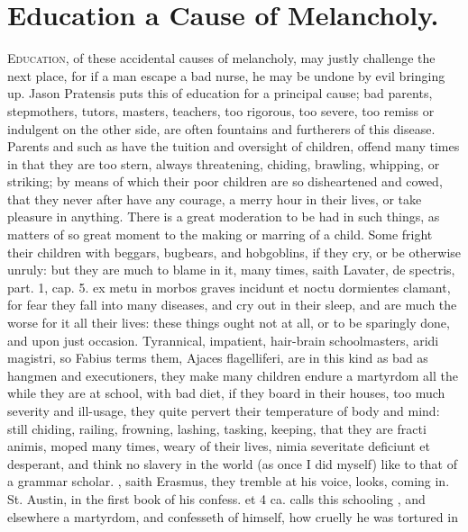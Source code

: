 {%
\section{Education a Cause of Melancholy.}

\lettrine{E}{ducation}, of these accidental causes of melancholy, may justly
challenge the next place, for if a man escape a bad nurse, he may be
undone by evil bringing up. Jason Pratensis puts this of
education for a principal cause; bad parents, stepmothers, tutors,
masters, teachers, too rigorous, too severe, too remiss or indulgent on
the other side, are often fountains and furtherers of this disease.
Parents and such as have the tuition and oversight of children, offend
many times in that they are too stern, always threatening, chiding,
brawling, whipping, or striking; by means of which their poor children
are so disheartened and cowed, that they never after have any courage,
a merry hour in their lives, or take pleasure in anything. There is a
great moderation to be had in such things, as matters of so great
moment to the making or marring of a child. Some fright their children
with beggars, bugbears, and hobgoblins, if they cry, or be otherwise
unruly: but they are much to blame in it, many times, saith Lavater, de
spectris, part. 1, cap. 5. ex metu in morbos graves incidunt et noctu
dormientes clamant, for fear they fall into many diseases, and cry out
in their sleep, and are much the worse for it all their lives: these
things ought not at all, or to be sparingly done, and upon just
occasion. Tyrannical, impatient, hair-brain schoolmasters, aridi
magistri, so Fabius terms them, Ajaces flagelliferi, are in this
kind as bad as hangmen and executioners, they make many children endure
a martyrdom all the while they are at school, with bad diet, if they
board in their houses, too much severity and ill-usage, they quite
pervert their temperature of body and mind: still chiding, railing,
frowning, lashing, tasking, keeping, that they are fracti animis, moped
many times, weary of their lives, nimia severitate deficiunt et
desperant, and think no slavery in the world (as once I did myself)
like to that of a grammar scholar. , saith Erasmus, they tremble at his voice,
looks, coming in. St. Austin, in the first book of his confess. et 4
ca. calls this schooling , and elsewhere a
martyrdom, and confesseth of himself, how cruelly he was tortured in
}
